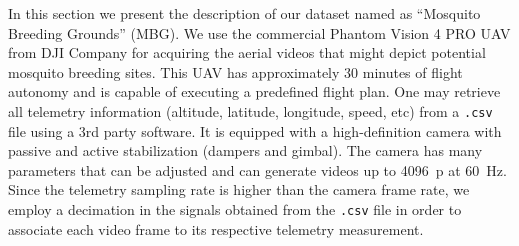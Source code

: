 %
In this section we present the description of our dataset named as ``Mosquito Breeding Grounds'' (MBG). 
We use the commercial Phantom Vision 4 PRO UAV from DJI Company for acquiring the aerial videos that might depict potential mosquito breeding sites.
%
This UAV has approximately 30 minutes of flight autonomy and is capable of executing a predefined flight plan.
One may retrieve all telemetry information (\eg altitude, latitude, longitude, speed, etc) from a \verb|.csv| file using a 3rd party software.
It is equipped with a high-definition camera with passive and active stabilization (dampers and gimbal).
%
The camera has many parameters that can be adjusted and can generate videos up to 4096~p at 60~Hz.
%
Since the telemetry sampling rate is higher than the camera frame rate, we employ a decimation in the signals obtained from the \verb|.csv| file in order to associate each video frame to its respective telemetry measurement.
%

